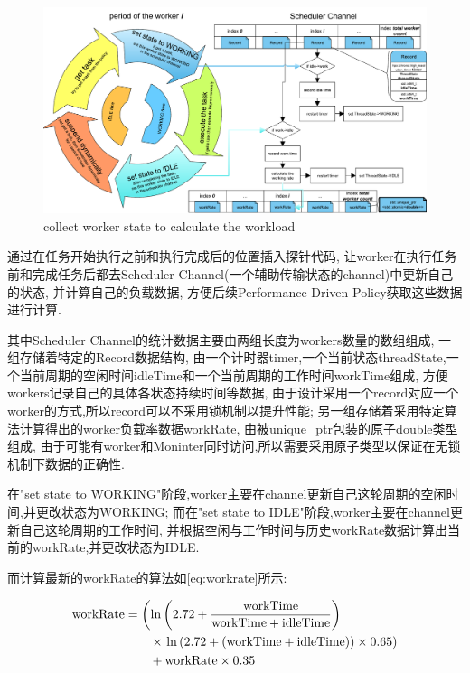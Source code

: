 \documentclass{mproj}
\begin{document}
\begin{figure}[h]
    \centering %
    \includegraphics[width=1.0\textwidth]{images/worker_collect_calculate.pdf} %
    \caption{collect worker state to calculate the workload} %
    \label{fig:worker_collect_calculate} %
\end{figure}
\FloatBarrier

通过在任务开始执行之前和执行完成后的位置插入探针代码,
让worker在执行任务前和完成任务后都去Scheduler Channel(一个辅助传输状态的channel)中更新自己的状态,
并计算自己的负载数据,
方便后续Performance-Driven Policy获取这些数据进行计算.

其中Scheduler Channel的统计数据主要由两组长度为workers数量的数组组成,
一组存储着特定的Record数据结构,
由一个计时器timer,一个当前状态threadState,一个当前周期的空闲时间idleTime和一个当前周期的工作时间workTime组成,
方便workers记录自己的具体各状态持续时间等数据,
由于设计采用一个record对应一个worker的方式,所以record可以不采用锁机制以提升性能;
另一组存储着采用特定算法计算得出的worker负载率数据workRate,
由被unique\_ptr包装的原子double类型组成,
由于可能有worker和Moninter同时访问,所以需要采用原子类型以保证在无锁机制下数据的正确性.

在"set state to WORKING"阶段,worker主要在channel更新自己这轮周期的空闲时间,并更改状态为WORKING;
而在"set state to IDLE"阶段,worker主要在channel更新自己这轮周期的工作时间,
并根据空闲与工作时间与历史workRate数据计算出当前的workRate,并更改状态为IDLE.

而计算最新的workRate的算法如\cref{eq:workrate}所示:

\begin{align}
    \text{workRate} & = \left( \ln\left( 2.72 + \frac{\text{workTime}}{\text{workTime} + \text{idleTime}} \right) \right. \notag   \\
                    & \qquad \times \left. \ln\left( 2.72 + (\text{workTime} + \text{idleTime}) \right) \times 0.65 \right) \notag \\
                    & \qquad + \text{workRate} \times 0.35 \label{eq:workrate}
\end{align}
\end{document}
